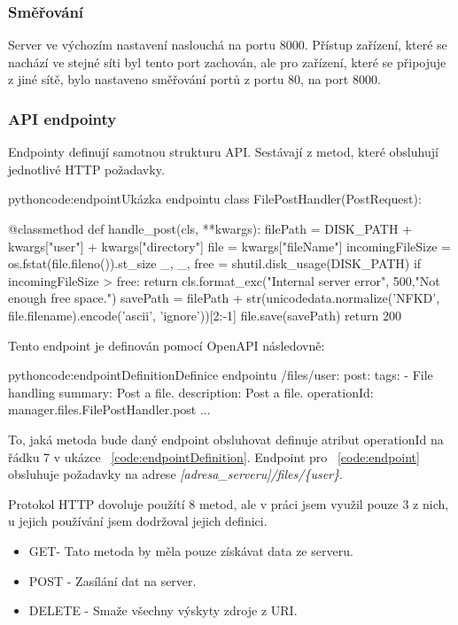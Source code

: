 \documentclass[
  glossaries,
]{kidiplom}
\begin{document}
\subsubsection{Směřování}
Server ve výchozím nastavení naslouchá na portu 8000. Přístup zařízení, které se nachází ve stejné síti byl tento port zachován, ale pro zařízení, které se připojuje z jiné sítě, bylo nastaveno směřování portů z portu 80, na port 8000.

\subsubsection{API endpointy}
Endpointy definují samotnou strukturu API. Sestávají z metod, které obsluhují jednotlivé HTTP požadavky.
\begin{kicode}{python}{code:endpoint}{Ukázka endpointu}
class FilePostHandler(PostRequest):

    @classmethod
    def handle_post(cls, **kwargs):
        filePath = DISK_PATH + kwargs["user"] + kwargs["directory"]
        file = kwargs["fileName"]
        incomingFileSize = os.fstat(file.fileno()).st_size
        _, _, free = shutil.disk_usage(DISK_PATH)
        if incomingFileSize > free:
            return cls.format_exc("Internal server error", 500,"Not enough free space.") 
        savePath = filePath + str(unicodedata.normalize('NFKD', file.filename).encode('ascii', 'ignore'))[2:-1]
        file.save(savePath)
        return 200
\end{kicode}

Tento endpoint je definován pomocí OpenAPI následovně:

\begin{kicode}{python}{code:endpointDefinition}{Definice endpointu}
  /files/{user}:
    post:
      tags: 
        - File handling
      summary: Post a file.
      description: Post a file.
      operationId: manager.files.FilePostHandler.post
      ...
\end{kicode}


To, jaká metoda bude daný endpoint obsluhovat definuje atribut operationId na řádku 7 v ukázce ~\ref{code:endpointDefinition}. Endpoint pro  
~\ref{code:endpoint} obsluhuje požadavky na adrese 
\textit{[adresa\_serveru]/files/\{user\}}.

Protokol HTTP dovoluje použítí 8 \cite{HTTPmethods} metod, ale v práci jsem využil pouze 3 z nich, u jejich používání jsem dodržoval jejich definici.
\begin{itemize}
	\item GET- Tato metoda by měla pouze získávat data ze serveru.
	\item POST - Zasílání dat na server.
	\item DELETE - Smaže všechny výskyty zdroje z URI. 
\end{itemize}
\end{document}
